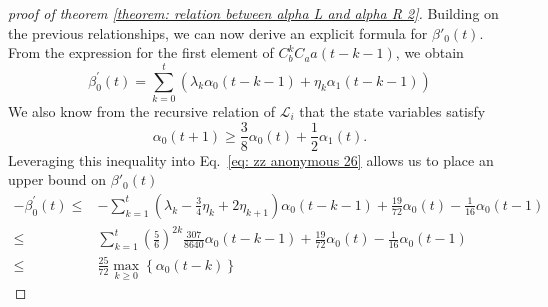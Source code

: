 \documentclass{article}
\newtheorem{corollary}{Corollary}
\newcommand{\Twhole}{T^{(\text{whole})}}
\begin{document}
\begin{proof}[proof of theorem \ref{theorem: relation between alpha L and alpha R 2}]
Building on the previous relationships, we can now derive an explicit formula for $\beta'_0(t)$. From the expression for the first element of $C_b^kC_aa(t-k-1)$, we obtain
\begin{equation}
    \beta_0^{\prime}(t)=\sum_{k=0}^t\left(\lambda_k \alpha_0(t-k-1)+\eta_k \alpha_1(t-k-1)\right)
    \label{eq: zz anonymous 26}
\end{equation}
We also know from the recursive relation of $\mathcal{L}_i$ that the state variables satisfy
\begin{equation}
\alpha_0(t+1) \geq \frac{3}{8} \alpha_0(t)+\frac{1}{2} \alpha_1(t).
\end{equation}
Leveraging this inequality into Eq.~\ref{eq: zz anonymous 26} allows us to place an upper bound on $\beta'_0(t)$
\begin{align}
-\beta_0^{\prime}(t) \leq & -\sum_{k=1}^t\left(\lambda_k-\frac{3}{4} \eta_k+2 \eta_{k+1}\right) \alpha_0(t-k-1)+ \frac{19}{72} \alpha_0(t) - \frac{1}{16}\alpha_0(t-1) \\
\leq & \sum_{k=1}^t\left(\frac{5}{6}\right)^{2 k} \frac{307}{8640} \alpha_0(t-k-1)+ \frac{19}{72} \alpha_0(t) - \frac{1}{16}\alpha_0(t-1) \\
\leq & \frac{25}{72} \max_{k \geq 0}\left\{\alpha_0(t-k)\right\}
\end{align}

    
\end{proof}



\end{document}
